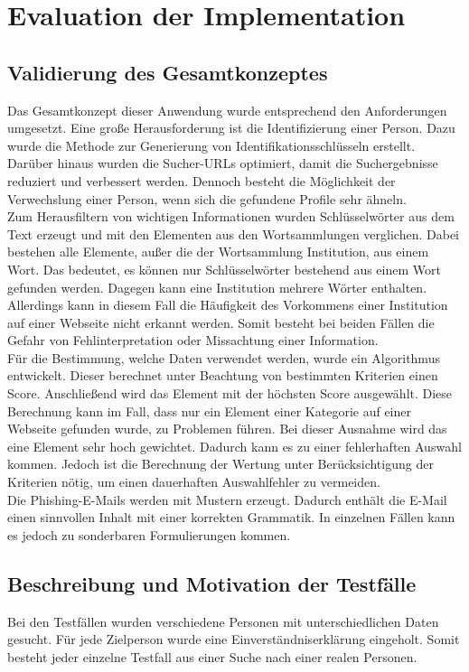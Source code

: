 

\chapter{Evaluation der Implementation}  %
\label{cha:Evaluation der Implementation} %
\section{Validierung des Gesamtkonzeptes}
Das Gesamtkonzept dieser Anwendung wurde entsprechend den Anforderungen umgesetzt. Eine große Herausforderung ist die Identifizierung einer Person. Dazu wurde die Methode zur Generierung von Identifikationsschlüsseln erstellt. Darüber hinaus wurden die Sucher-URLs optimiert, damit die Suchergebnisse reduziert und verbessert werden. Dennoch besteht die Möglichkeit der Verwechslung einer Person, wenn sich die gefundene Profile sehr ähneln.\\
Zum Herausfiltern von wichtigen Informationen wurden Schlüsselwörter aus dem Text erzeugt und mit den Elementen aus den Wortsammlungen verglichen. Dabei bestehen alle Elemente, außer die der Wortsammlung Institution, aus einem Wort. Das bedeutet, es können nur Schlüsselwörter bestehend aus einem Wort gefunden werden. Dagegen kann eine Institution mehrere Wörter enthalten. Allerdings kann in diesem Fall die Häufigkeit des Vorkommens einer Institution auf einer Webseite nicht erkannt werden. Somit besteht bei beiden Fällen die Gefahr von Fehlinterpretation oder Missachtung einer Information.\\
Für die Bestimmung, welche Daten verwendet werden, wurde ein Algorithmus entwickelt. Dieser berechnet unter Beachtung von bestimmten Kriterien einen Score. Anschließend wird das Element mit der höchsten Score ausgewählt. Diese Berechnung kann im Fall, dass nur ein Element einer Kategorie auf einer Webseite gefunden wurde, zu Problemen führen. Bei dieser Ausnahme wird das eine Element sehr hoch gewichtet. Dadurch kann es zu einer fehlerhaften Auswahl kommen. Jedoch ist die Berechnung der Wertung unter Berücksichtigung der Kriterien nötig, um einen dauerhaften Auswahlfehler zu vermeiden.\\
Die Phishing-E-Mails werden mit Mustern erzeugt. Dadurch enthält die E-Mail einen sinnvollen Inhalt mit einer korrekten Grammatik. In einzelnen Fällen kann es jedoch zu sonderbaren Formulierungen kommen.

\section{Beschreibung und Motivation der Testfälle}
Bei den Testfällen wurden verschiedene Personen mit unterschiedlichen Daten gesucht. Für jede Zielperson wurde eine Einverständniserklärung eingeholt. Somit besteht jeder einzelne Testfall aus einer Suche nach einer realen Personen.
